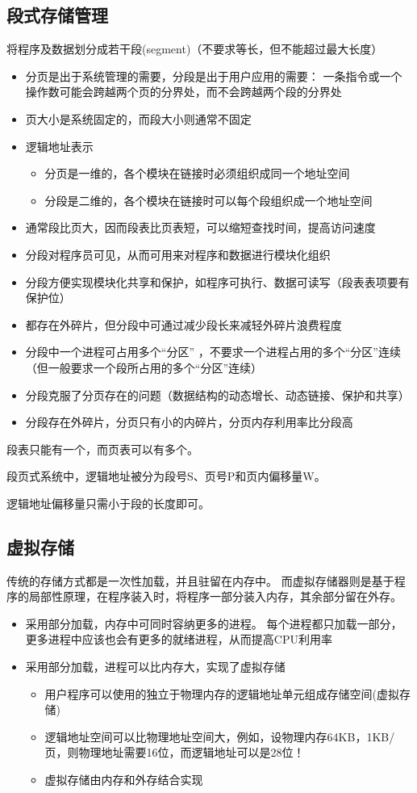 \subsection{段式存储管理}
将程序及数据划分成若干段(segment)（不要求等长，但不能超过最大长度）
\begin{itemize}
    \item 分页是出于系统管理的需要，分段是出于用户应用的需要：
    一条指令或一个操作数可能会跨越两个页的分界处，而不会跨越两个段的分界处
    \item 页大小是系统固定的，而段大小则通常不固定
    \item 逻辑地址表示
    \begin{itemize}
    \item 分页是一维的，各个模块在链接时必须组织成同一个地址空间
    \item 分段是二维的，各个模块在链接时可以每个段组织成一个地址空间
    \end{itemize}
    \item 通常段比页大，因而段表比页表短，可以缩短查找时间，提高访问速度
    \item 分段对程序员可见，从而可用来对程序和数据进行模块化组织
    \item 分段方便实现模块化共享和保护，如程序可执行、数据可读写（段表表项要有保护位）
    \item 都存在外碎片，但分段中可通过减少段长来减轻外碎片浪费程度
    \item 分段中一个进程可占用多个“分区” ，不要求一个进程占用的多个“分区”连续（但一般要求一个段所占用的多个“分区”连续）
    \item 分段克服了分页存在的问题（数据结构的动态增长、动态链接、保护和共享）
    \item 分段存在外碎片，分页只有小的内碎片，分页内存利用率比分段高
\end{itemize}

段表只能有一个，而页表可以有多个。

段页式系统中，逻辑地址被分为段号S、页号P和页内偏移量W。

逻辑地址偏移量只需小于段的长度即可。

\subsection{虚拟存储}
传统的存储方式都是一次性加载，并且驻留在内存中。
而虚拟存储器则是基于程序的局部性原理，在程序装入时，将程序一部分装入内存，其余部分留在外存。
\begin{itemize}
    \item 采用部分加载，内存中可同时容纳更多的进程。
每个进程都只加载一部分，更多进程中应该也会有更多的就绪进程，从而提高CPU利用率
    \item 采用部分加载，进程可以比内存大，实现了虚拟存储
    \begin{itemize}
\item 用户程序可以使用的独立于物理内存的逻辑地址单元组成存储空间(虚拟存储)
\item 逻辑地址空间可以比物理地址空间大，例如，设物理内存64KB，1KB/页，则物理地址需要16位，而逻辑地址可以是28位！
\item 虚拟存储由内存和外存结合实现
    \end{itemize}
\end{itemize}

